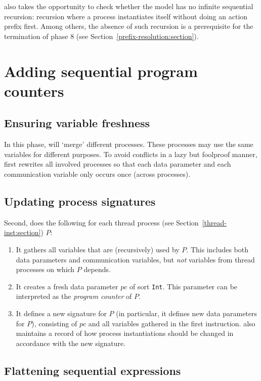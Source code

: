 \lpeq{} also takes the opportunity to check whether the model has no infinite sequential recursion: recursion where a process instantiates itself without doing an action prefix first.
Among others, the absence of such recursion is a prerequisite for the termination of phase 8 (see Section~\ref{prefix-resolution:section}).

\section{Adding sequential program counters}

\subsection{Ensuring variable freshness}

In this phase, \lpeq{} will `merge' different processes.
These processes may use the same variables for different purposes.
To avoid conflicts in a lazy but foolproof manner, \lpeq{} first rewrites all involved processes so that each data parameter and each communication variable only occurs once (across processes).

\subsection{Updating process signatures}

Second, \lpeq{} does the following for each thread process (see Section~\ref{thread-inst:section}) $P$:
\begin{enumerate}[1.]
\item It gathers all variables that are (recursively) used by $P$.
This includes both data parameters and communication variables, but \emph{not} variables from thread processes on which $P$ depends.
\item It creates a fresh data parameter $\textit{pc}$ of sort \texttt{Int}.
This parameter can be interpreted as the \emph{program counter} of $P$.
\item It defines a new signature for $P$ (in particular, it defines new data parameters for $P$), consisting of $\textit{pc}$ and all variables gathered in the first instruction.
\lpeq{} also maintains a record of how process instantiations should be changed in accordance with the new signature.
\end{enumerate}

\subsection{Flattening sequential expressions} \label{flattenseqexprs:section}

